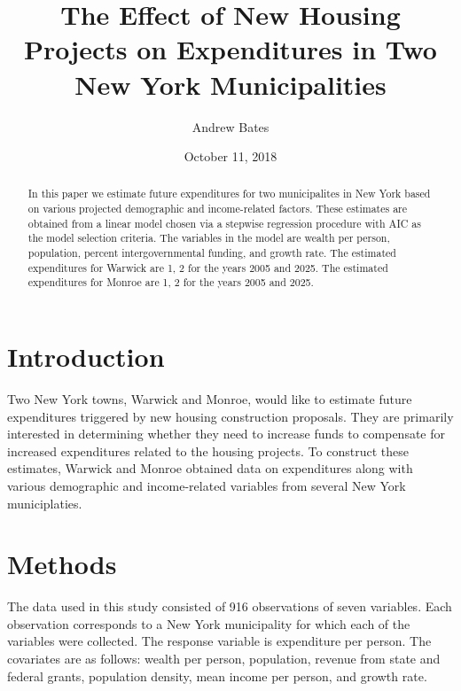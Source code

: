 \documentclass{article}\usepackage[]{graphicx}\usepackage[]{color}
\title{The Effect of New Housing Projects on Expenditures in Two New York Municipalities}
\author{Andrew Bates}
\date{October 11, 2018}
\begin{document}
 
\maketitle

\begin{abstract}
In this paper we estimate future expenditures for two municipalites in New York based on various projected demographic and income-related factors. These estimates are obtained from a linear model chosen via a stepwise regression procedure with AIC as the model selection criteria. The variables in the model are wealth per person, population, percent intergovernmental funding, and growth rate. The estimated expenditures for Warwick are 1, 2 for the years 2005 and 2025. The estimated expenditures for Monroe are 1, 2 for the years 2005 and 2025.
\end{abstract}


\section{Introduction} \label{intro}

Two New York towns, Warwick and Monroe, would like to estimate future expenditures triggered by new housing construction proposals. They are primarily interested in determining whether they need to increase funds to compensate for increased expenditures related to the housing projects. To construct these estimates, Warwick and Monroe obtained data on expenditures along with various demographic and income-related variables from several New York municiplaties. 

\section{Methods} \label{methods}

The data used in this study consisted of 916 observations of seven variables. Each observation corresponds to a New York municipality for which each of the variables were collected. The response variable is expenditure per person. The covariates are as follows: wealth per person, population, revenue from state and federal grants, population density, mean income per person, and growth rate.
\end{document}
